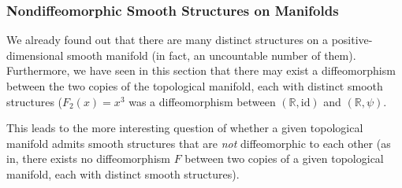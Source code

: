 \documentclass{article}
\theoremstyle{remark}
\theoremstyle{definition}
\begin{document}
    \subsubsection{Nondiffeomorphic Smooth Structures on Manifolds}

      We already found out that there are many distinct structures on a positive-dimensional smooth manifold (in fact, an uncountable number of them). Furthermore, we have seen in this section that there may exist a diffeomorphism between the two copies of the topological manifold, each with distinct smooth structures ($F_2 (x) = x^3$ was a diffeomorphism between $(\mathbb{R}, \text{id})$ and $(\mathbb{R}, \psi)$. 

      This leads to the more interesting question of whether a given topological manifold admits smooth structures that are \textit{not} diffeomorphic to each other (as in, there exists no diffeomorphism $F$ between two copies of a given topological manifold, each with distinct smooth structures). 
\end{document}
